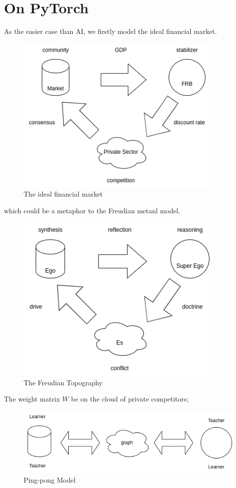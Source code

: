\documentclass[a4paper, 10pt]{article}
\begin{document}
\section{On PyTorch}
As the easier case than AI, we firstly model the ideal financial market.
\begin{figure}[H]
\centering
\includegraphics[width=10cm]
{trinity.png}
\caption{The ideal financial market}
\end{figure}
which could be a metaphor to the Freudian metanl model.
\begin{figure}[H]
\centering
\includegraphics[width=10cm]
{topography.png}
\caption{The Freudian Topography}
\end{figure}
The weight matrix $W$ be on the cloud of private competitors; 
\begin{figure}[H]
\centering
\includegraphics[width=12cm]
{pingpong.png}
\caption{Ping-pong Model}
\end{figure}
\end{document}
